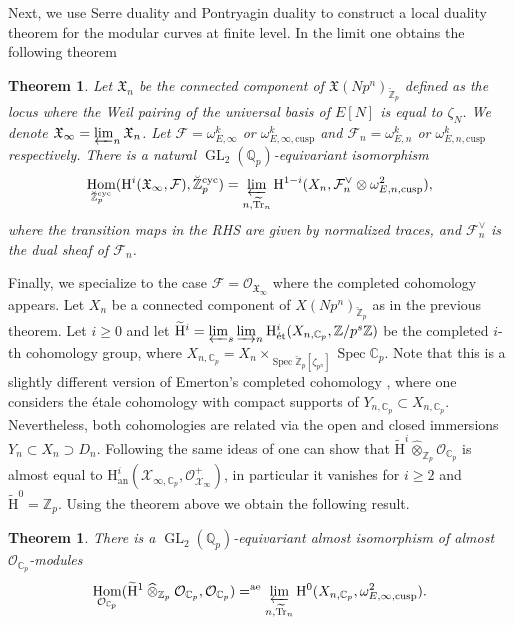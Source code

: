 \documentclass[11pt]{article}
\newcommand{\rae}{\mathrm{ae}}
\newcommand{\an}{\mathrm{an}}
\newcommand{\cusp}{\mathrm{cusp}}
\newcommand{\cyc}{\mathrm{cyc}}
\newcommand{\et}{\mathrm{\acute{e}t}}
\newcommand{\wotimes}{\mathbin{\widehat\otimes}}
\numberwithin{equation}{section}
\newtheorem{theo}[prop]{Theorem}
\theoremstyle{definition}
\newcommand{\bb}[1]{\mathbb{#1}}
\newcommand{\n}[1]{\mathcal{#1}}
\newcommand{\f}[1]{\mathfrak{#1}}
\newcommand{\s}[1]{\mathscr{#1}}
\DeclareMathOperator{\GL}{GL}
\DeclareMathOperator{\Tr}{Tr}
\DeclareMathOperator{\Hom}{Hom}
\DeclareMathOperator{\Spec}{Spec}
\begin{document}
Next, we use Serre duality and Pontryagin duality to construct a local duality theorem for the modular curves at finite level. In the limit one obtains the following theorem
\begin{theo}
\label{Theo3Intro}
Let $\f{X}_n$ be the connected component of $\f{X}(Np^n)_{\breve{\bb{Z}}_p}$ defined as the locus where the Weil pairing of the universal basis of $E[N]$ is equal to $\zeta_{N}$. We denote $\f{X}_{\infty}= \varprojlim_n \f{X}_n$. Let $\n{F}= \omega^k_{E,\infty}$ or $\omega^k_{E,\infty, \cusp}$ and $\n{F}_n= \omega^k_{E,n}$ or $\omega^k_{E,n,\cusp}$ respectively. There is a natural $\GL_2(\bb{Q}_p)$-equivariant isomorphism
\[
\Hom_{\breve{\bb{Z}}_p^{\cyc} }(\mathrm{H}^i(\f{X}_{\infty}, \n{F}), \breve{\bb{Z}}_p^{\cyc}) = \varprojlim_{n, \widetilde{\Tr}_n} \mathrm{H}^{1-i}(X_n, \n{F}^\vee_n \otimes \omega^2_{E,n,\cusp}),
\]
where the transition maps in the RHS are given by normalized traces, and $\n{F}_n^\vee$ is the dual sheaf of $\n{F}_n$.
\end{theo}
Finally, we specialize to the case $\n{F}= \s{O}_{\f{X}_{\infty}}$ where the completed cohomology appears. Let $X_n$ be a connected component of $X(Np^n)_{\breve{\bb{Z}}_p}$ as in the previous theorem. Let $i\geq 0$ and let $\widetilde{\mathrm{H}}^i= \varprojlim_s \varinjlim_n \mathrm{H}^i_{\et}(X_{n,\bb{C}_p}, \bb{Z}/p^s \bb{Z})$ be the completed $i$-th cohomology group, where $X_{n,\bb{C}_p}= X_n\times_{\Spec \breve{\bb{Z}}_p[\zeta_{p^n}] }\Spec \bb{C}_p$. Note that this is a slightly different version of Emerton's completed cohomology \cite{MR2207783}, where one considers the étale cohomology with compact supports of $Y_{n,\bb{C}_p}\subset X_{n,\bb{C}_p}$. Nevertheless, both cohomologies are related via the open and closed immersions $Y_n \subset X_n \supset D_n$. Following the same ideas of \cite[\S 4.2]{scholzeTorsCoho2015} one can show that $\widetilde{\mathrm{H}}^i\wotimes_{\bb{Z}_p} \n{O}_{\bb{C}_p}$ is almost equal to $\mathrm{H}^i_{\an}(\n{X}_{\infty, \bb{C}_p}, \s{O}^+_{\n{X}_{\infty}})$, in particular it vanishes for $i\geq 2$ and $\widetilde{\mathrm{H}}^0= \bb{Z}_p$. Using the theorem above we obtain the following result.

\begin{theo}
\label{Theo4Intro}
There is a $\GL_2(\bb{Q}_p)$-equivariant almost isomorphism of almost $\n{O}_{\bb{C}_p}$\nobreakdash-modules
\[
\Hom_{\n{O}_{\bb{C}_p}}(\widetilde{\mathrm{H}}^1\wotimes_{\bb{Z}_p} \n{O}_{\bb{C}_p}, \n{O}_{\bb{C}_p})=^{\rae} \varprojlim_{n, \widetilde{\Tr}_n} \mathrm{H}^0(X_{n,\bb{C}_p}, \omega^2_{E,\infty,\cusp}).
\]
\end{theo}
\end{document}
